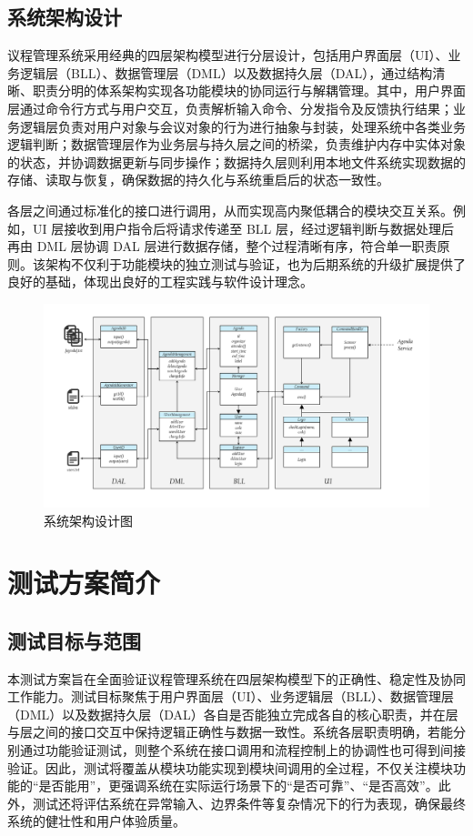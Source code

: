\documentclass[a4paper, twoside, utf8]{ctexart}
\begin{document}
    \subsection{系统架构设计}

    议程管理系统采用经典的四层架构模型进行分层设计，包括用户界面层（UI）、业务逻辑层（BLL）、数据管理层（DML）以及数据持久层（DAL），通过结构清晰、职责分明的体系架构实现各功能模块的协同运行与解耦管理。其中，用户界面层通过命令行方式与用户交互，负责解析输入命令、分发指令及反馈执行结果；业务逻辑层负责对用户对象与会议对象的行为进行抽象与封装，处理系统中各类业务逻辑判断；数据管理层作为业务层与持久层之间的桥梁，负责维护内存中实体对象的状态，并协调数据更新与同步操作；数据持久层则利用本地文件系统实现数据的存储、读取与恢复，确保数据的持久化与系统重启后的状态一致性。

    各层之间通过标准化的接口进行调用，从而实现高内聚低耦合的模块交互关系。例如，UI 层接收到用户指令后将请求传递至 BLL 层，经过逻辑判断与数据处理后再由 DML 层协调 DAL 层进行数据存储，整个过程清晰有序，符合单一职责原则。该架构不仅利于功能模块的独立测试与验证，也为后期系统的升级扩展提供了良好的基础，体现出良好的工程实践与软件设计理念。

    \begin{figure}
        \centering
        \includegraphics[width=.9\linewidth]{figure/structure.png}
        \caption{系统架构设计图}
    \end{figure}

    \section{测试方案简介}

    \subsection{测试目标与范围}

    本测试方案旨在全面验证议程管理系统在四层架构模型下的正确性、稳定性及协同工作能力。测试目标聚焦于用户界面层（UI）、业务逻辑层（BLL）、数据管理层（DML）以及数据持久层（DAL）各自是否能独立完成各自的核心职责，并在层与层之间的接口交互中保持逻辑正确性与数据一致性。系统各层职责明确，若能分别通过功能验证测试，则整个系统在接口调用和流程控制上的协调性也可得到间接验证。因此，测试将覆盖从模块功能实现到模块间调用的全过程，不仅关注模块功能的“是否能用”，更强调系统在实际运行场景下的“是否可靠”、“是否高效”。此外，测试还将评估系统在异常输入、边界条件等复杂情况下的行为表现，确保最终系统的健壮性和用户体验质量。
\end{document}
